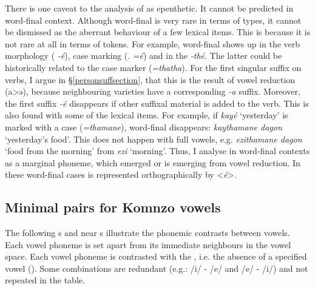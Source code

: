 There is one caveat to the analysis of  as epenthetic. It cannot be predicted in word-final context. Although word-final  is very rare in terms of types, it cannot be dismissed as the aberrant behaviour of a few lexical items. This is because it is not rare at all in terms of tokens. For example, word-final  shows up in the verb morphology (\Fsg{} \emph{-é}), case marking (\Erg.\Nsg{} \emph{=é}) and in the  \emph{-thé}. The latter could be historically related to the  case marker (\emph{=thatha}). For the first singular suffix on verbs, I argue in \S{}\ref{personsuffsection}, that this is the result of vowel reduction (a>ə), because neighbouring varieties have a corresponding \emph{-a} suffix. Moreover, the first  suffix \emph{-é} disappears if other suffixal material is added to the verb. This is also found with some of the lexical items. For example, if \emph{kayé} `yesterday' is marked with a   case (\emph{=thamane}), word-final  disappears: \emph{kaythamane dagon} `yesterday's food'. This does not happen with full vowels, e.g. \emph{ezithamane dagon} `food from the morning' from \emph{ezi} `morning'. Thus, I analyse  in word-final contexts as a marginal phoneme, which emerged or is emerging from vowel reduction. In these word-final cases  is represented orthographically by <\emph{é}>.

\subsection{Minimal pairs for Komnzo vowels} \label{minimalpairsvowels}

The following s and near s illustrate the phonemic contrasts between vowels. Each vowel phoneme is set apart from its immediate neighbours in the vowel space. Each vowel phoneme is contrasted with the , i.e. the absence of a specified vowel (\Zero{}). Some combinations are redundant (e.g.: /i/ - /e/ and /e/ - /i/) and not repeated in the table.


